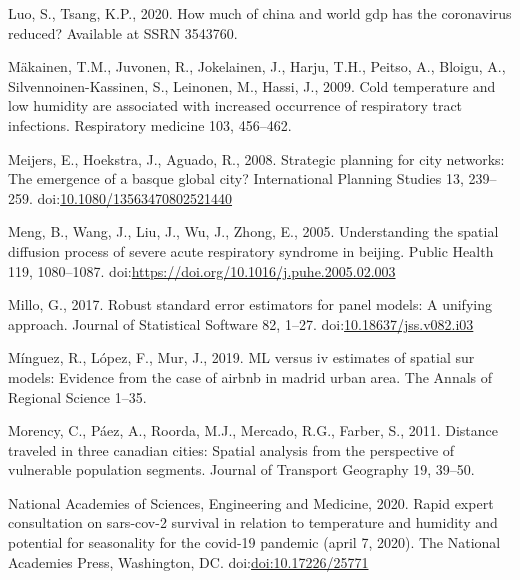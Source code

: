 \documentclass[]{elsarticle} %
\begin{document}
\leavevmode\hypertarget{ref-Luo2020how}{}%
Luo, S., Tsang, K.P., 2020. How much of china and world gdp has the
coronavirus reduced? Available at SSRN 3543760.

\leavevmode\hypertarget{ref-Makinen2009cold}{}%
Mäkainen, T.M., Juvonen, R., Jokelainen, J., Harju, T.H., Peitso, A.,
Bloigu, A., Silvennoinen-Kassinen, S., Leinonen, M., Hassi, J., 2009.
Cold temperature and low humidity are associated with increased
occurrence of respiratory tract infections. Respiratory medicine 103,
456--462.

\leavevmode\hypertarget{ref-Meijers2008strategic}{}%
Meijers, E., Hoekstra, J., Aguado, R., 2008. Strategic planning for city
networks: The emergence of a basque global city? International Planning
Studies 13, 239--259.
doi:\href{https://doi.org/10.1080/13563470802521440}{10.1080/13563470802521440}

\leavevmode\hypertarget{ref-Meng2005understanding}{}%
Meng, B., Wang, J., Liu, J., Wu, J., Zhong, E., 2005. Understanding the
spatial diffusion process of severe acute respiratory syndrome in
beijing. Public Health 119, 1080--1087.
doi:\href{https://doi.org/https://doi.org/10.1016/j.puhe.2005.02.003}{https://doi.org/10.1016/j.puhe.2005.02.003}

\leavevmode\hypertarget{ref-Millo2017robust}{}%
Millo, G., 2017. Robust standard error estimators for panel models: A
unifying approach. Journal of Statistical Software 82, 1--27.
doi:\href{https://doi.org/10.18637/jss.v082.i03}{10.18637/jss.v082.i03}

\leavevmode\hypertarget{ref-Minguez2019}{}%
Mínguez, R., López, F., Mur, J., 2019. ML versus iv estimates of spatial
sur models: Evidence from the case of airbnb in madrid urban area. The
Annals of Regional Science 1--35.

\leavevmode\hypertarget{ref-Morency2011distance}{}%
Morency, C., Páez, A., Roorda, M.J., Mercado, R.G., Farber, S., 2011.
Distance traveled in three canadian cities: Spatial analysis from the
perspective of vulnerable population segments. Journal of Transport
Geography 19, 39--50.

\leavevmode\hypertarget{ref-National2020rapid}{}%
National Academies of Sciences, Engineering and Medicine, 2020. Rapid
expert consultation on sars-cov-2 survival in relation to temperature
and humidity and potential for seasonality for the covid-19 pandemic
(april 7, 2020). The National Academies Press, Washington, DC.
doi:\href{https://doi.org/doi:10.17226/25771}{doi:10.17226/25771}
\end{document}
